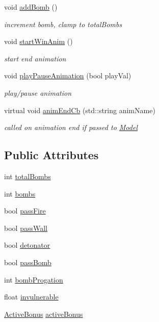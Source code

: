 \begin{DoxyCompactItemize}
void \hyperlink{class_player_ab01e550627a1b778e1fa09b29fd89a1a}{add\+Bomb} ()
\begin{DoxyCompactList}\small\item\em increment bomb, clamp to total\+Bombs \end{DoxyCompactList}\item 
\mbox{\label{class_player_a887060c225dcc34aa7d029be67033e20}} 
void \hyperlink{class_player_a887060c225dcc34aa7d029be67033e20}{start\+Win\+Anim} ()
\begin{DoxyCompactList}\small\item\em start end animation \end{DoxyCompactList}\item 
void \hyperlink{class_player_acfee156e2e7cdcb474a1f34fec5bfa6d}{play\+Pause\+Animation} (bool play\+Val)
\begin{DoxyCompactList}\small\item\em play/pause animation \end{DoxyCompactList}\item 
virtual void \hyperlink{class_player_a26c511cf5a62d7de26347cdc15df609b}{anim\+End\+Cb} (std\+::string anim\+Name)
\begin{DoxyCompactList}\small\item\em called on animation end if passed to \hyperlink{class_model}{Model} \end{DoxyCompactList}\end{DoxyCompactItemize}
\subsection*{Public Attributes}
\begin{DoxyCompactItemize}
\item 
int \hyperlink{class_player_ab7d65b25086c7d78b7caef025deb087f}{total\+Bombs}
\item 
int \hyperlink{class_player_a948d5a3b282419b995dcc32f66bf6b54}{bombs}
\item 
bool \hyperlink{class_player_a91fb928013bca6ca637afe447027de8f}{pass\+Fire}
\item 
bool \hyperlink{class_player_a82630036d62dbc37a2518be049a974cc}{pass\+Wall}
\item 
bool \hyperlink{class_player_a2dfa1c51a817ec617e0dc0191481d4a8}{detonator}
\item 
bool \hyperlink{class_player_ad02e5cdd124ec622ad4c8ddde93a0906}{pass\+Bomb}
\item 
int \hyperlink{class_player_a51ec1da9050f53921825a472b39b9977}{bomb\+Progation}
\item 
float \hyperlink{class_player_a6629cf50b360b714f0593146e2e058b6}{invulnerable}
\item 
\hyperlink{struct_player_1_1_active_bonus}{Active\+Bonus} \hyperlink{class_player_ab8221d150947cc7ff0a87bc44a3cb431}{active\+Bonus}
\end{DoxyCompactItemize}
